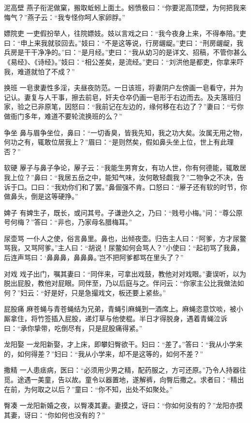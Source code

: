 \documentclass[12pt,UTF8]{ctexbook}
\begin{document}
泥高壁
燕子衔泥做窠，搬取蚯蚓上面土。蚓愤极曰：“你要泥高顶壁，为何把我来悔气？”燕子云：“我专怪你呵人家卵脬。”

嫖院吏
一吏假扮举人，往院嫖妓。妓以言戏之曰：“我今夜身上来，不得奉陪。”吏曰：“申上来我就驳回去。”妓曰：“不是这等说，行房龌龊。”吏曰：“刑房龌龊，我兵房是干干净净的。”曰：“是月经。”吏曰：“我从幼习的是详文、招稿，不管你甚么《易经》、《诗经》。”妓曰：“相公差矣，是流经。”吏曰：“刘洪他是都吏，你拿来吓我，难道就怕了不成？”

换班
一皂隶妻性多淫，夫昼夜防范。一日该班，将妻阴户左傍画一皂看守，并为记认。妻复与人干事，擦去前皂，奸夫仓卒仍画一皂形于右边而去。及夫落班归家，验之已非原笔，因怒曰：“我前记在左边的，缘何移在右边了？”妻曰：“亏你做衙门多年，难道不要轮流换班的么？”

争坐
鼻与眉争坐位，鼻曰：“一切香臭，皆我先知，我之功大矣。汝属无用之物，何功之有，辄敢位居我上？”眉曰：“是则然矣，假如鼻头坐上位，世上有此理否？”

软硬
屪子与鼻子争论，屪子云：“我能生男育女，有功人世，你有何德能，辄敢居我上位？”鼻曰：“我居五岳之中，能知气味，汝何敢轻觑我？”二物争之不决，告诉于口。口曰：“我劝你们和了罢。”鼻倔强不肯。口怒曰：“屪子还有软的时节，你做鼻头，倒是这等硬挣。”

婢子
有婢生子，既长，或问其号。子谦逊久之，乃曰：“贱号小梅。”问：“尊公原号何梅？”答曰：“非也，乃家母名腊梅耳。”

尿壶骂
一仆人之使，俗言鼻里。鼻也，出倾夜壶。归告主人曰：“阿爹，方才尿鳖骂我，又骂阿爹。”主人曰：“胡说！尿鳖如何会骂人？”小使曰：“起初骂了我鼻，后连声骂曰：‘鼻鼻鼻，鼻鼻鼻。’岂不把阿爹都骂在里头了？”

对戏
戏子出门，嘱其妻曰：“同伴来，可拿出戏鼓，教他对对戏眼。”妻误听，以为脱出屁股，教他对屁眼。同伴至，乃以后庭与之。伴问云：“你家主公比我做法如何？”妇云：“好是好，只是急撮戏文，板还要上紧些。”

屁股痛
麻苍蝇与青苍蝇结为兄弟，青蝇引麻蝇到一酒席上。麻蝇恣意饮啖，被小厮拿住，将竹签插入屁股，递灯草与他使棍。半日才得脱身，遇着青蝇泣诉曰：“承你挚带，吃倒尽有，只是屁股痛得紧。”

龙阳娶
一龙阳新娶，才上床，即攀妇臀欲干。妇曰：“差了。”答曰：“我从小学来的，如何得差？”妇曰：“我从小学来，却不是这等的，如何不差？”

撒精
一人患㾀病，医曰：“必须用少男之精，配药服之，方可还原。”乃令人持器往觅。途遇一美童，告以故。童令以器置地，遂解裤，向臀后撒之。求者曰：“精出在前，为何取之以后？”童曰：“你不知，出处不如聚处。”

臀凑
一龙阳新婚之夜，以臀凑其妻。妻摸之，讶曰：“你如何没有的？”龙阳亦摸其妻，讶曰：“你如何也没有的？”
\end{document}
